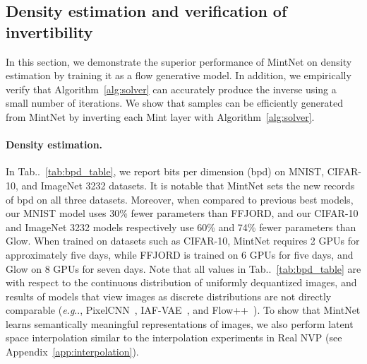 \documentclass{article}
\makeatletter
\def\@onedot{\ifx\@let@token.\else.\null\fi\xspace}
\DeclareRobustCommand\onedot{\futurelet\@let@token\@onedot}
\newcommand{\algoref}[1]{Algorithm~\ref{#1}}
\newcommand{\tabref}[1]{Tab\onedot~\ref{#1}}
\def\eg{\emph{e.g}\onedot}
\makeatother
\begin{document}
\subsection{Density estimation and verification of invertibility}\label{sec:exp:invert}



In this section, we demonstrate the superior performance of MintNet on density estimation by training it as a flow generative model. In addition, we empirically verify that \algoref{alg:solver} can accurately produce the inverse using a small number of iterations. We show that samples can be efficiently generated from MintNet by inverting each Mint layer with \algoref{alg:solver}.
\paragraph{Density estimation.}
In \tabref{tab:bpd_table}, we report bits per dimension (bpd) on MNIST, CIFAR-10, and ImageNet 3232 datasets. It is notable that MintNet sets the new records of bpd on all three datasets. Moreover, when compared to previous best models, our MNIST model uses 30\% fewer parameters than FFJORD, and our CIFAR-10 and ImageNet 3232 models respectively use 60\% and 74\% fewer parameters than Glow. When trained on datasets such as CIFAR-10, MintNet requires 2 GPUs for approximately five days, while FFJORD is trained on 6 GPUs for five days, and Glow on 8 GPUs for seven days. 
Note that all values in \tabref{tab:bpd_table} are with respect to the continuous distribution of uniformly dequantized images, and results of models that view images as discrete distributions are not directly comparable (\eg, PixelCNN~\cite{oord2016pixel}, IAF-VAE~\cite{kingma2016iaf}, and Flow++~\cite{ho2019flow}). To show that MintNet learns semantically meaningful representations of images, we also perform latent space interpolation similar to the interpolation experiments in Real NVP (see Appendix~\ref{app:interpolation}).
\end{document}
